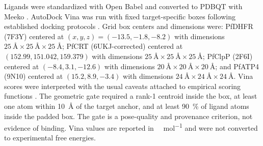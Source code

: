 \documentclass[journal=jcisd8,manuscript=article]{achemso}
\begin{document}
Ligands were standardized with Open Babel \cite{OBoyle2011} and converted to PDBQT with Meeko \cite{Eberhardt2021}. AutoDock Vina was run with fixed target-specific boxes following established docking protocols \cite{Trott2009}. Grid box centers and dimensions were: PfDHFR (7F3Y) centered at $(x,y,z) = (\num{-13.5}, \num{-1.8}, \num{-8.2})$ with dimensions $\SI{25}{\angstrom} \times \SI{25}{\angstrom} \times \SI{25}{\angstrom}$; PfCRT (6UKJ-corrected) centered at $(\num{152.99}, \num{151.042}, \num{159.379})$ with dimensions $\SI{25}{\angstrom} \times \SI{25}{\angstrom} \times \SI{25}{\angstrom}$; PfClpP (2F6I) centered at $(\num{-8.4}, \num{3.1}, \num{-12.6})$ with dimensions $\SI{20}{\angstrom} \times \SI{20}{\angstrom} \times \SI{20}{\angstrom}$; and PfATP4 (9N10) centered at $(\num{15.2}, \num{8.9}, \num{-3.4})$ with dimensions $\SI{24}{\angstrom} \times \SI{24}{\angstrom} \times \SI{24}{\angstrom}$. Vina scores were interpreted with the usual caveats attached to empirical scoring functions \cite{Quiroga2016}. The geometric gate required a rank-1 centroid inside the box, at least one atom within \qty{10}{\angstrom} of the target anchor, and at least \qty{90}{\percent} of ligand atoms inside the padded box. The gate is a pose-quality and provenance criterion, not evidence of binding. Vina values are reported in \si{\kilo\calorie\per\mole} and were not converted to experimental free energies.
\end{document}
